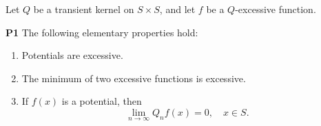 Let $Q$ be a transient kernel on $S \times S$, and let $f$ be a $Q$-excessive function.

\textbf{P1} The following elementary properties hold:

\begin{enumerate}
\item[(1)] Potentials are excessive.
\item[(2)] The minimum of two excessive functions is excessive.
\item[(3)] If $f(x)$ is a potential, then
$$\lim_{n \to \infty} Q_n f(x) = 0, \quad x \in S.$$
\end{enumerate}
